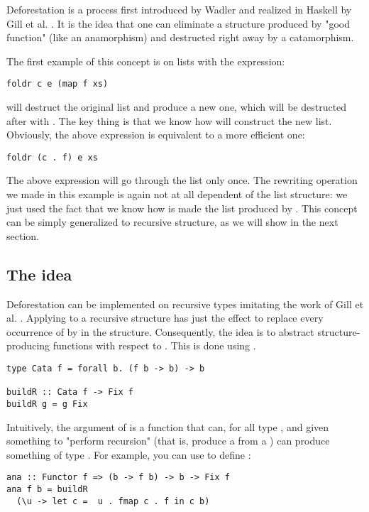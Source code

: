 
Deforestation is a process first introduced by Wadler \cite{WADLER1990231} and realized in Haskell by Gill et al. \cite{Gill:1993:SCD:165180.165214}. It is the idea that one can eliminate a structure produced by "good function" (like an anamorphism) and destructed right away by a catamorphism.

The first example of this concept is on lists with the expression:
\begin{verbatim}
foldr c e (map f xs)
\end{verbatim}
 will destruct the original list and produce a new one, which will be destructed after with . The key thing is that we know how  will construct the new list. Obviously, the above expression is equivalent to a more efficient one:
\begin{verbatim}
foldr (c . f) e xs
\end{verbatim}
The above expression will go through the list only once.
The rewriting operation we made in this example is again not at all dependent of the list structure: we just used the fact that we know how is made the list produced by . This concept can be simply generalized to recursive structure, as we will show in the next section.

\subsection{The idea}
Deforestation can be implemented on recursive types imitating the work of Gill et al. \cite{Gill:1993:SCD:165180.165214}. Applying  to a recursive structure has just the effect to replace every occurrence of  by  in the structure. Consequently, the idea is to abstract structure-producing functions with respect to . This is done using .

\begin{verbatim}
type Cata f = forall b. (f b -> b) -> b

buildR :: Cata f -> Fix f
buildR g = g Fix
\end{verbatim}

\noindent Intuitively, the argument of  is a function that can, for all type , and given something to "perform recursion" (that is, produce a  from a ) can produce something of type . For example, you can use  to define :
\begin{verbatim}
ana :: Functor f => (b -> f b) -> b -> Fix f
ana f b = buildR
  (\u -> let c =  u . fmap c . f in c b)
\end{verbatim}

